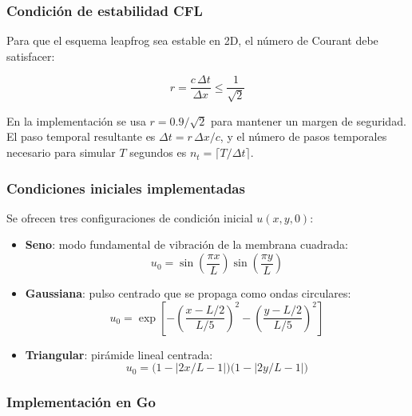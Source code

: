 \documentclass[12pt, a4paper]{article}
\begin{document}
\subsubsection{Condición de estabilidad CFL}

Para que el esquema leapfrog sea estable en 2D, el número de Courant debe satisfacer:

\begin{equation}
    r = \frac{c\,\Delta t}{\Delta x} \leq \frac{1}{\sqrt{2}}
    \label{eq:cfl-onda}
\end{equation}

En la implementación se usa $r = 0.9/\sqrt{2}$ para mantener un margen de seguridad.
El paso temporal resultante es $\Delta t = r\,\Delta x / c$, y el número de pasos
temporales necesario para simular $T$ segundos es $n_t = \lceil T / \Delta t \rceil$.

\subsubsection{Condiciones iniciales implementadas}

Se ofrecen tres configuraciones de condición inicial $u(x,y,0)$:

\begin{itemize}
    \item \textbf{Seno}: modo fundamental de vibración de la membrana cuadrada:
    \[u_0 = \sin\!\left(\frac{\pi x}{L}\right)\sin\!\left(\frac{\pi y}{L}\right)\]
    \item \textbf{Gaussiana}: pulso centrado que se propaga como ondas circulares:
    \[u_0 = \exp\!\left[-\left(\frac{x-L/2}{L/5}\right)^{\!2}
            -\left(\frac{y-L/2}{L/5}\right)^{\!2}\right]\]
    \item \textbf{Triangular}: pirámide lineal centrada:
    \[u_0 = \bigl(1-|2x/L-1|\bigr)\bigl(1-|2y/L-1|\bigr)\]
\end{itemize}

\subsubsection{Implementación en Go}
\end{document}
